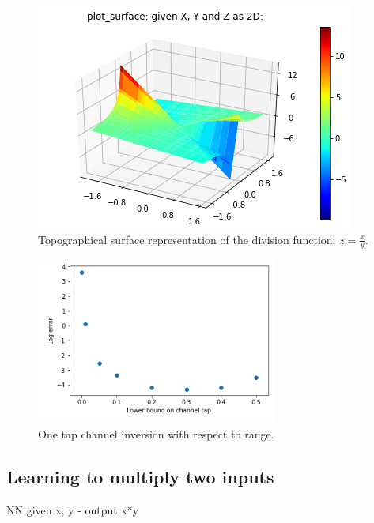 \begin{figure}
\begin{center}
\includegraphics{figures/equal/Division_Function_plot.png}
\caption{Topographical surface representation of the division function; $z=\frac{x}{y}$.}
\end{center}
\label{fig:div_fx}
\end{figure}

\begin{figure}
\begin{center}
\includegraphics{figures/equal/One_tap_channel_inversion.png}
\caption{One tap channel inversion with respect to range.}
\end{center}
\label{fig:one_tap_inv}
\end{figure}

\subsection{Learning to multiply two inputs}
NN given x, y - output x*y

